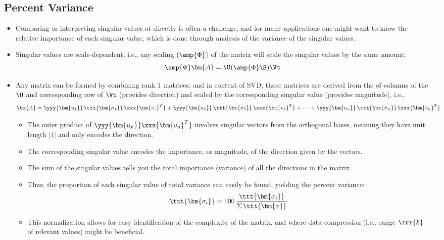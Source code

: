 \begin{itemize}
  \subsection{Percent Variance}\label{Percent Variance}
  \begin{itemize}
    \item Comparing or interpreting singular values at directly is often a challenge, and for many applications one might want to know the relative importance of each singular value, which is done through analysis of the variance of the singular values.
    \item Singular values are scale-dependent, i.e., any scaling \((\amp{\Phi})\) of the matrix  will scale the singular values by the same amount:
    \[%
    \amp{\Phi}\bm{A} = \U(\amp{\Phi}\S)\Vt
    \]%
    \item Any matrix can be formed by combining rank 1 matrices, and in context of SVD, those matrices are derived from the \hyperref[Outer Product]{} of columns of the \(\U\) and corresponding row of \(\Vt\) (provides direction) and scaled by the corresponding singular value (provides magnitude), i.e.,
    \[%
    \bm{A} = 
    \yyy{\bm{u_1}}\,\ttt{\bm{\sigma_1}}\,\xxx{\bm{v_1}^T} +
    \yyy{\bm{u_2}}\,\ttt{\bm{\sigma_2}}\,\xxx{\bm{v_2}^T} +
    \cdots +
    \yyy{\bm{u_n}}\,\ttt{\bm{\sigma_n}}\,\xxx{\bm{v_n}^T}
    \]%
    \begin{itemize}
      \item The outer product of \(\yyy{\bm{u_n}}\xxx{\bm{v_n}^T}\) involves singular vectors from the orthogonal bases, meaning they have unit length \(|1|\) and only encodes the direction.  
      \item The corresponding singular value encodes the importance, or magnitude, of the direction given by the vectors.
      \item The sum of the singular values tells you the total importance (variance) of all the directions in the matrix.
      \item Thus, the proportion of each singular value of total variance can easily be found, yielding the percent variance:
      \[%
      \ttt{\bm{\sigma_i}} = 100\:\frac{\ttt{\bm{\sigma_i}}}{\Sigma\,\ttt{\bm{\sigma}}}
      \]%
      \item This normalization allows for easy identification of the complexity of the matrix, and where data compression (i.e., range \(\rrr{k}\) of relevant values) might be beneficial.
    \end{itemize}
  \end{itemize}
  

\end{itemize}
